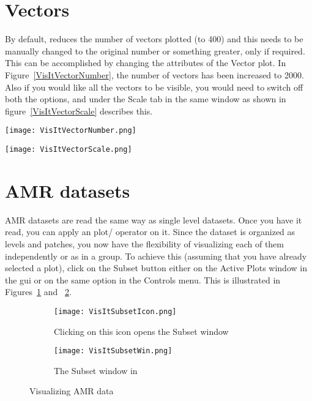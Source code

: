 \section{Vectors}
By default, \Visit reduces the number of vectors plotted (to 400) and
this needs to be manually changed to the original number or something
greater, only if required.  This can be accomplished by changing the
attributes of the Vector plot. In Figure~\ref{VisItVectorNumber}, the
number of vectors has been increased to 2000.
Also if you would like all the vectors to be visible, you would need
to switch off both the options,  and
 under the Scale tab in the same window as
shown in figure~\ref{VisItVectorScale} describes this.

\begin{minipage}{\textwidth}
  \begin{minipage}{0.5\textwidth}
  \centering
  \texttt{[image: VisItVectorNumber.png]}
  \label{VisItVectorNumber}
  \end{minipage}
  \begin{minipage}{0.5\textwidth}
  \centering
  \texttt{[image: VisItVectorScale.png]}
  \label{VisItVectorScale}
  \end{minipage}
\end{minipage}

\section{AMR datasets}
AMR datasets are read the same way as single level datasets. Once you
have it read, you can apply an plot/ operator on it. Since the dataset
is organized as levels and patches, you now have the flexibility of
visualizing each of them independently or as in a group. To achieve
this (assuming that you have already selected a plot), click on the
Subset button either on the Active Plots window in the gui or on the
same option in the Controls menu. This is illustrated in
Figures~\ref{VisItSubsetIcon} and ~\ref{VisItSubsetWin}.
\begin{figure}
  \centering
  \begin{subfigure}[b]{0.4\textwidth}
    \centering
    \texttt{[image: VisItSubsetIcon.png]}
    \caption{Clicking on this icon opens the Subset window}
    \label{VisItSubsetIcon}
  \end{subfigure}
  \begin{subfigure}[b]{0.4\textwidth}
    \centering
    \texttt{[image: VisItSubsetWin.png]}
    \caption{The Subset window in \Visit}
    \label{VisItSubsetWin}
  \end{subfigure}
  \caption{Visualizing AMR data}
  \label{ucf:fig3}
\end{figure}


